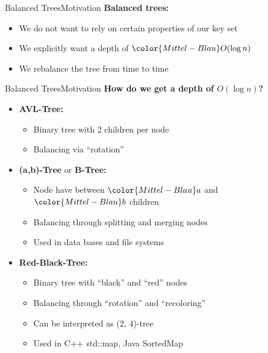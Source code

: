 
\begin{frame}{Balanced Trees}{Motivation}
  \textbf{Balanced trees:}
  \begin{itemize}
    \item<2->
      We do not want to rely on certain properties of our {\color{Mittel-Blau}key set}
    \item<3->
      We explicitly want a depth of ${\color{Mittel-Blau}O(\log n)}$
    \item<4->
      We {\color{Mittel-Blau}rebalance} the tree from time to time
  \end{itemize}
\end{frame}


\begin{frame}{Balanced Trees}{Motivation}
  \textbf{How do we get a depth of $O(\log n)$?}
  \begin{itemize}
    \item<2->
      \textbf{AVL-Tree:}
      \begin{itemize}
        \item<3->
          Binary tree with 2 children per node
        \item<4->
          Balancing via \enquote{\color{Mittel-Blau}rotation}
      \end{itemize}
    \item<5->
      \textbf{(a,b)-Tree} or \textbf{B-Tree:}
      \begin{itemize}
        \item<6->
          Node have between ${\color{Mittel-Blau}a}$ and
          ${\color{Mittel-Blau}b}$ children
        \item<7->
          Balancing through {\color{Mittel-Blau}splitting} and
          {\color{Mittel-Blau}merging} nodes
        \item<8->
          Used in data bases and file systems
      \end{itemize}
    \item<9->
      \textbf{Red-Black-Tree:}
      \begin{itemize}
        \item<10->
          Binary tree with \enquote{black} and \enquote{red} nodes
        \item<11->
          Balancing through \enquote{\color{Mittel-Blau}rotation} and
          \enquote{\color{Mittel-Blau}recoloring}
        \item<12->
          Can be interpreted as (2, 4)-tree
        \item<13->
          Used in C++ std::map, Java SortedMap
      \end{itemize}
  \end{itemize}
\end{frame}
